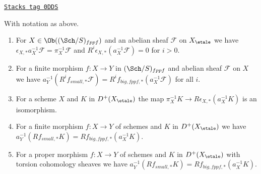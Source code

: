 \begin{lemma}
\label{etale-cohomology-lemma-V-C-all-n-etale-fppf}
\href{https://stacks.math.columbia.edu/tag/0DDS}{\texttt{Stacks tag 0DDS}}

With notation as above.
\begin{enumerate}
\item For $X \in \Ob((\Sch/S)_{fppf})$ and an abelian sheaf $\mathcal{F}$
on $X_\etale$ we have
$\epsilon_{X, *}a_X^{-1}\mathcal{F} = \pi_X^{-1}\mathcal{F}$
and $R^i\epsilon_{X, *}(a_X^{-1}\mathcal{F}) = 0$ for $i > 0$.
\item For a finite morphism $f : X \to Y$ in $(\Sch/S)_{fppf}$
and abelian sheaf $\mathcal{F}$ on $X$ we have
$a_Y^{-1}(R^if_{small, *}\mathcal{F}) =
R^if_{big, fppf, *}(a_X^{-1}\mathcal{F})$
for all $i$.
\item For a scheme $X$ and $K$ in $D^+(X_\etale)$ the map
$\pi_X^{-1}K \to R\epsilon_{X, *}(a_X^{-1}K)$ is an isomorphism.
\item For a finite morphism $f : X \to Y$ of schemes
and $K$ in $D^+(X_\etale)$ we have
$a_Y^{-1}(Rf_{small, *}K) = Rf_{big, fppf, *}(a_X^{-1}K)$.
\item For a proper morphism $f : X \to Y$ of schemes
and $K$ in $D^+(X_\etale)$ with torsion cohomology sheaves we have
$a_Y^{-1}(Rf_{small, *}K) = Rf_{big, fppf, *}(a_X^{-1}K)$.
\end{enumerate}
\end{lemma}

